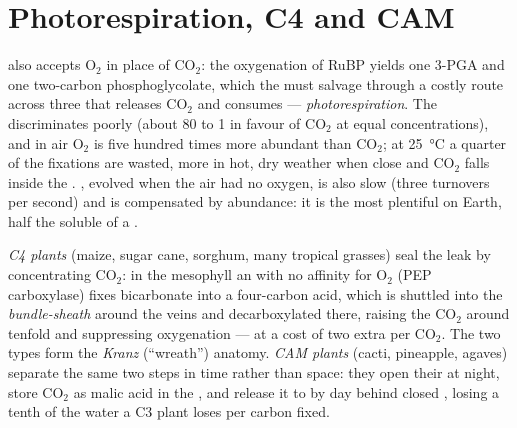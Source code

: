 \section{Photorespiration, C4 and CAM}

\begin{proposition}\label{prop:b1:photosynthesis:photorespiration}
 also accepts $\mathrm{O_2}$ in place of $\mathrm{CO_2}$: the
oxygenation of RuBP yields one 3-PGA and one two-carbon phosphoglycolate,
which the  must salvage through a costly route across three
 that releases $\mathrm{CO_2}$ and consumes  ---
\emph{photorespiration}. The  discriminates poorly (about
\qty{80}{} to 1 in favour of $\mathrm{CO_2}$ at equal concentrations),
and in air $\mathrm{O_2}$ is five hundred times more abundant than
$\mathrm{CO_2}$; at \qty{25}{\celsius} a quarter of the fixations are
wasted, more in hot, dry weather when  close and $\mathrm{CO_2}$
falls inside the . , evolved when the air had no oxygen, is
also slow (three turnovers per second) and is compensated by
abundance: it is the most plentiful  on Earth, half the soluble
 of a .
\end{proposition}

\begin{definition}\label{def:b1:photosynthesis:c4cam}
\emph{C4 plants} (maize, sugar cane, sorghum, many tropical grasses)
seal the leak by concentrating $\mathrm{CO_2}$: in the mesophyll 
an  with no affinity for $\mathrm{O_2}$ (PEP carboxylase) fixes
bicarbonate into a four-carbon acid, which is shuttled into the
\emph{bundle-sheath}  around the veins and decarboxylated there,
raising the $\mathrm{CO_2}$ around  tenfold and suppressing
oxygenation --- at a cost of two extra  per $\mathrm{CO_2}$. The two
 types form the \emph{Kranz} (``wreath'') anatomy. \emph{CAM plants}
(cacti, pineapple, agaves) separate the same two steps in time rather
than space: they open their  at night, store $\mathrm{CO_2}$ as
malic acid in the , and release it to  by day behind
closed , losing a tenth of the water a C3 plant loses per
carbon fixed.
\end{definition}

